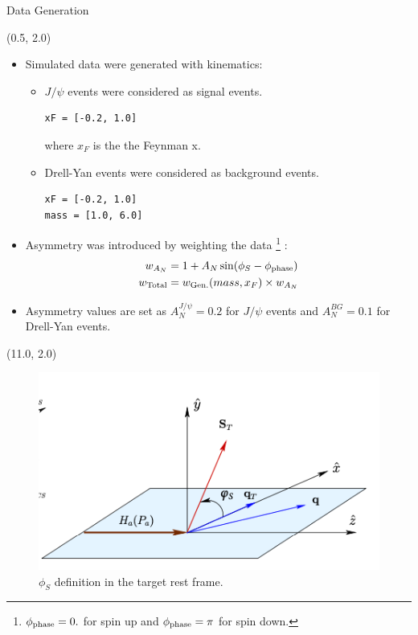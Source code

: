 \documentclass[10pt, xcolor={dvipsnames}, aspectratio = 169]{beamer}
\newcommand{\citeme}[1]{{\tiny \footfullcite{#1}}}
\newcommand{\jpsi}{$J/\psi$ }
\begin{document}
\begin{frame}[fragile]{Data Generation}

\begin{textblock}{14.0}(0.5, 2.0)

\begin{itemize}

\item Simulated data were generated with kinematics:

\begin{itemize}
\item \jpsi events were considered as signal events.

\begin{verbatim}
xF = [-0.2, 1.0]
\end{verbatim}
where $x_{F}$ is the the Feynman x.

\item Drell-Yan events were considered as background events.
\begin{verbatim}
xF = [-0.2, 1.0]
mass = [1.0, 6.0]
\end{verbatim}
\end{itemize}

\item Asymmetry was introduced by weighting the data \footnote{\tiny $\phi_{\rm phase} = 0.$ for spin up and $\phi_{\rm phase} = \pi$ for spin down.} :
\begin{align*}
w_{A_{N}} &= 1 + A_{N} \sin(\phi_{S} - \phi_{\rm phase})\\
w_{\text{Total}} &= w_{\text{Gen.}}(mass, x_{F}) \times w_{A_{N}}
\end{align*}

\item Asymmetry values are set as $A_{N}^{J/\psi} = 0.2$ for \jpsi events and $A_{N}^{BG} = 0.1$ for Drell-Yan events.

\end{itemize}
\end{textblock}

\begin{textblock}{5.0}(11.0, 2.0)
\begin{figure}
    \centering
    \includegraphics[width = 5.0 cm]{imgs/phi_angle.png}
    \caption{$\phi_{S}$ definition in the target rest frame.\citeme{Longo:2017snu}}
\end{figure}
\end{textblock}

\end{frame}
\end{document}
